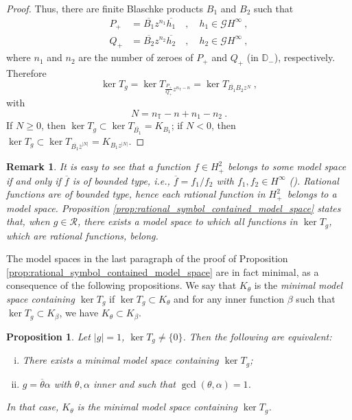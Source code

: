 \documentclass{article}
\numberwithin{equation}{section}
\theoremstyle{plain}
\newtheorem{prop}[thm]{Proposition}
\newtheorem{rem}[thm]{Remark}
\newcommand{\Hp}{\ensuremath{H^2_+}}
\newcommand{\Hinf}{\ensuremath{H^\infty}}
\newcommand{\TT}{\ensuremath{\mathbb{T}}}
\newcommand{\DD}{\ensuremath{\mathbb{D}}}
\newcommand{\GG}{\ensuremath{\mathcal{G}}}
\newcommand{\RR}{\ensuremath{\mathcal{R}}}
\newcommand{\ol}[1]{\ensuremath{\overline{#1}}}
\newcommand{\zero}{\ensuremath{\{0\}}}
\newcommand{\kertg}{\ensuremath{\ker T_g}}
\begin{document}
\begin{proof}
Thus, there are finite Blaschke products $B_1$ and $B_2$ such that 
\begin{align}
P_+ &= \ol{B_1} z^{n_1} \ol{h_1} \quad , \quad h_1\in\GG\Hinf\ , \label{eq:B1_def}\\
Q_+ &= \ol{B_2} z^{n_2} \ol{h_2} \quad , \quad h_2\in\GG\Hinf\ ,
\end{align}
where $n_1$ and $n_2$ are the number of zeroes of $P_+$ and $Q_+$ (in $\DD_-$), respectively.
Therefore
\begin{equation}
\kertg = \ker T_{\frac{P_+}{Q_+}z^{n_\TT -n}} = \ker T_{\ol{B_1}B_2 z^N}\ ,
\end{equation}
with
\begin{equation}
\label{eq:N_def}
N = n_\TT - n + n_1 - n_2\ .
\end{equation}
If $N\geq 0$, then $\kertg\subset \ker T_{\ol{B_1}} = K_{B_1}$;
if $N<0$, then $\kertg\subset \ker T_{\ol{B_1}\ol z^{|N|}} = K_{B_1 z^{|N|}}$.
\end{proof}


\begin{rem}
It is easy to see that a function $f\in\Hp$ belongs to some model space if and only if $\ol f$ is of bounded type, i.e., $\ol f = f_1 / f_2$ with $f_1,f_2 \in \Hinf$ (\cite{Ne70}).
Rational functions are of bounded type, hence each rational function in \Hp\ belongs to a model space.
Proposition \ref{prop:rational_symbol_contained_model_space} states that, when $g\in\RR$, there exists a model space to which all functions in \kertg, which are rational functions, belong.
\end{rem}


The model spaces in the last paragraph of the proof of Proposition \ref{prop:rational_symbol_contained_model_space} are in fact minimal, as a consequence of the following propositions.
We say that $K_\theta$ is the {\em minimal model space containing $\kertg$} if $\kertg \subset K_\theta$ and for any inner function $\beta$ such that $\kertg \subset K_\beta$, we have $K_\theta \subset K_\beta$.


\begin{prop}
\label{prop:minimal_model_space_condition}
Let $|g|=1$, $\kertg\neq\zero$.
Then the following are equivalent:
\begin{enumerate}[(i)]
\item There exists a minimal model space containing \kertg;

\item $g = \ol\theta \alpha$ with $\theta,\alpha$ inner and such that $\gcd (\theta, \alpha) = 1$.
\end{enumerate}
In that case, $K_\theta$ is the minimal model space containing \kertg.
\end{prop}
\end{document}
